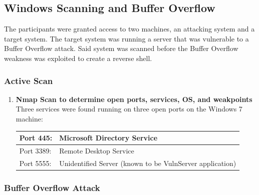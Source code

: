 \documentclass[../report.tex]{subfiles}
\begin{document}
\subsection{Windows Scanning and Buffer Overflow}
The participants were granted access to two machines, an attacking system and a target system.
The target system was running a server that was vulnerable to a Buffer Overflow attack.
Said system was scanned before the Buffer Overflow weakness was exploited to create a reverse shell.
\vspace{-10mm}
\subsubsection{Active Scan}

\begin{enumerate}
\item{\textbf{Nmap Scan to determine open ports, services, OS, and weakpoints}}\\
Three services were found running on three open ports on the Windows 7 machine:\\[0.5em]
\begin{tabular}{l | l}
Port 445: & Microsoft Directory Service\\
\hline
Port 3389: & Remote Desktop Service\\
\hline
Port 5555: & Unidentified Server (known to be VulnServer application)
\end{tabular}	
\end{enumerate}

\vspace{-6mm}
\subsubsection{Buffer Overflow Attack}
\end{document}
